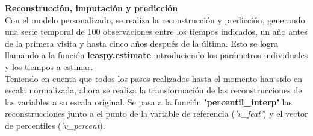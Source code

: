 \begin{description}
	 \item \textbf{Reconstrucción, imputación y predicción}\\
	 Con el modelo personalizado, se realiza la reconstrucción y predicción, generando una serie temporal de 100 observaciones entre los tiempos indicados, un año antes de la primera visita y hasta cinco años después de la última. Esto se logra llamando a la función \textbf{leaspy.estimate} introduciendo los parámetros individuales y los tiempos a estimar.\\
	 
	 Teniendo en cuenta que todos los pasos realizados hasta el momento han sido en escala normalizada, ahora se realiza la transformación de las reconstrucciones de las variables a su escala original.  Se pasa a la función \textbf{'percentil\_interp'} las reconstrucciones junto a el punto de la variable de referencia (\textit{'v\_feat'}) y el vector de percentiles (\textit{'v\_percent}).
	 

\end{description}
